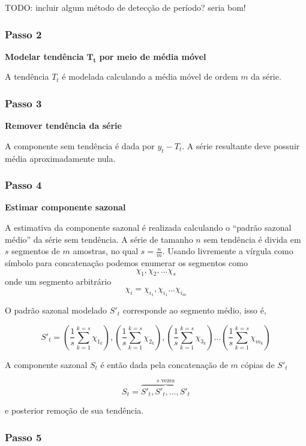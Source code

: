 TODO: incluir algum método de detecção de período? seria bom!

\subsubsection{Passo 2}

\textbf{Modelar tendência }$\mathbf{T_t}$\textbf{ por meio de média móvel}

A tendência $T_t$ é modelada calculando a média móvel de ordem $m$ da série.

\subsubsection{Passo 3}

\textbf{Remover tendência da série}

A componente sem tendência é dada por $y_t - T_t$. A série resultante deve
possuir média aproximadamente nula.

\subsubsection{Passo 4}

\textbf{Estimar componente sazonal}

A estimativa da componente sazonal é realizada calculando o ``padrão sazonal
médio'' da série sem tendência. A série de tamanho $n$ sem tendência é divida
em $s$ segmentos de $m$ amostras, no qual $s = \frac{n}{m}$. Usando livremente
a vírgula como símbolo para concatenação podemos enumerar os segmentos como
$$\chi_1, \chi_2, ... \chi_s$$ onde um segmento arbitrário $$\chi_i =
\chi_{i_{1}}, \chi_{i_{1}} ... \chi_{i_{m}}$$

O padrão sazonal modelado $S'_t$ corresponde ao segmento médio, isso é,

$$ S'_t = \left(\frac{1}{s} \sum_{k=1}^{k=s} \chi_{1_{k}}\right), \left(\frac{1}{s} \sum_{k=1}^{k=s} \chi_{2_{k}}\right), \left(\frac{1}{s} \sum_{k=1}^{k=s} \chi_{3_{k}}\right) \hdots \left(\frac{1}{s} \sum_{k=1}^{k=s} \chi_{m_{k}}\right)$$

A componente sazonal $S_t$ é então dada pela concatenação de $m$ cópias de
$S'_t$

$$ S_t = \overbrace{S'_t, S'_t, \hdots, S'_t}^{s\text{ vezes}} $$

e posterior remoção de sua tendência.

\subsubsection{Passo 5}

